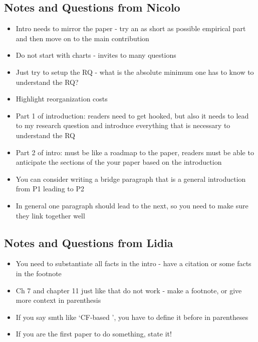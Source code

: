 \documentclass[12pt]{article}
\begin{document}
\subsection*{Notes and Questions from Nicolo} 
\begin{itemize} \setlength\itemsep{0em}  \small
    \item Intro needs to mirror the paper - try an as short as possible empirical part and then move on to the main contribution
    \item Do not start with charts - invites to many questions 
    \item Just try to setup the RQ - what is the absolute minimum one has to know to understand the RQ? 
    \item Highlight reorganization costs
    \item Part 1 of introduction: readers need to get hooked, but also it needs to lead to my research question and introduce everything that is necessary to understand the RQ
    \item Part 2 of intro: must be like a roadmap to the paper, readers must be able to anticipate the sections of the your paper based on the introduction
    \item You can consider writing a bridge paragraph that is a general introduction from P1 leading to P2
    \item In general one paragraph should lead to the next, so you need to make sure they link together well
\end{itemize} \normalsize

\subsection*{Notes and Questions from Lidia \checkmark} 
\begin{itemize} \setlength\itemsep{0em}  \small
    \item You need to substantiate all facts in the intro - have a citation or some facts in the footnote
    \item Ch 7 and chapter 11 just like that do not work - make a footnote, or give more context in parenthesis
    \item If you say smth like `CF-based ', you have to define it before in parentheses
    \item If you are the first paper to do something, state it! 
\end{itemize} \normalsize
\end{document}
